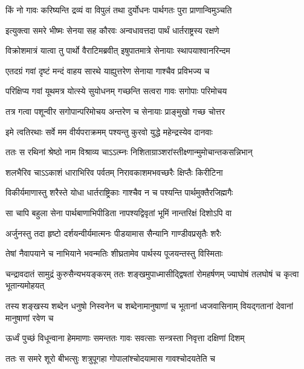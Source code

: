 \twolineshloka
{किं नो गावः करिष्यन्ति द्रव्यं वा विपुलं तथा}
{दुर्योधनः पार्थगतः पुरा प्राणान्विमुञ्चति}



\twolineshloka
{इत्युक्त्वा समरे भीष्मः सेनया सह कौरवः}
{अन्वधावत्तदा पार्थं धार्तराष्ट्रस्य रक्षणे}


\twolineshloka
{विक्रोशमात्रं यात्वा तु पार्थो वैराटिमब्रवीत्}
{इषुपातमात्रे सेनायाः स्थापयाश्वानरिन्दम}


\twolineshloka
{एतदग्रं गवां दृष्टं मन्दं वाहय सारथे}
{याह्युत्तरेण सेनाया गाश्चैव प्रविभज्य च}


\twolineshloka
{परिक्षिप्य गवां यूथमत्र योत्स्ये सुयोधनम्}
{गच्छन्ति सत्वरा गावः सगोपाः परिमोचय}


\twolineshloka
{तत्र गत्वा पशून्वीर सगोपान्परिमोचय}
{अन्तरेण च सेनायाः प्राङ्मुखो गच्छ चोत्तर}


\twolineshloka
{इमे त्वतिरथाः सर्वे मम वीर्यपराक्रमम्}
{पश्यन्तु कुरवो युद्धे महेन्द्रस्येव दानवाः}



\twolineshloka
{ततः स रथिनां श्रेष्ठो नाम विश्राव्य चाऽऽत्म्नः}
{निशिताग्राञ्शरांस्तीक्ष्णान्मुमोचान्तकसन्निभान्}


\twolineshloka
{शलभैरिव चाऽऽकाशं धाराभिरिव पर्वतम्}
{निरावकाशमभवच्छरैः क्षिप्तैः किरीटिना}


\twolineshloka
{विकीर्यमाणास्तु शरैस्ते योधा धार्तराष्ट्रिकाः}
{गाश्चैव न च पश्यन्ति पार्थमुक्तैरजिह्मगैः}


\twolineshloka
{सा चापि बहुला सेना पार्थबाणाभिपीडिता}
{नापश्यद्विवृतां भूमिं नान्तरिक्षं दिशोऽपि वा}


\twolineshloka
{अर्जुनस्तु तदा हृष्टो दर्शयन्वीर्यमात्मनः}
{पीडयामास सैन्यानि गाण्डीवप्रसृतैः शरैः}


\twolineshloka
{तेषां नैवापयाने च नाभियाने भवन्मतिः}
{शीघ्रतामेव पार्थस्य पूजयन्तस्तु विस्मिताः}


\threelineshloka
{चन्द्रावदातं सामुद्रं कुरुसैन्यभयङ्करम्}
{ततः शङ्खमुपाध्मासीद्द्विषतां रोमहर्षणम्}
{ज्याघोषं तलघोषं च कृत्वा भूतान्यमोहयत्}


\threelineshloka
{तस्य शङ्खस्य शब्देन धनुषो निस्वनेन च}
{शब्देनामानुषाणां च भूतानां ध्वजवासिनाम्}
{वियद्गतानां देवानां मानुषाणां रवेण च}


\twolineshloka
{ऊर्ध्वं पुच्छं विधून्वाना हेममाणाः समन्ततः}
{गावः सवत्साः सन्त्रस्ता निवृत्ता दक्षिणां दिशम्}


\twolineshloka
{ततः स समरे शूरो बीभत्सुः शत्रुपूगहा}
{गोपालांश्चोदयामास गावश्चोदयतेति च}


